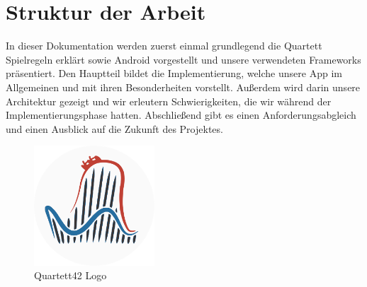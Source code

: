 \section{Struktur der Arbeit}
\label{sec:einleitung:struktur}

In dieser Dokumentation werden zuerst einmal grundlegend die Quartett Spielregeln erklärt sowie Android vorgestellt und unsere verwendeten Frameworks präsentiert. Den Hauptteil bildet die Implementierung, welche unsere App im Allgemeinen und mit ihren Besonderheiten vorstellt. Außerdem wird darin unsere Architektur gezeigt und wir erleutern Schwierigkeiten, die wir während der Implementierungsphase hatten. Abschließend gibt es einen Anforderungsabgleich und einen Ausblick auf die Zukunft des Projektes.\\

\begin{figure}[htp]
	\centering
  	\includegraphics[width=0.4\textwidth]{img/coaster42_logo.png}
	\caption{Quartett42 Logo}
	\label{figure:quartett42logo}
\end{figure}
